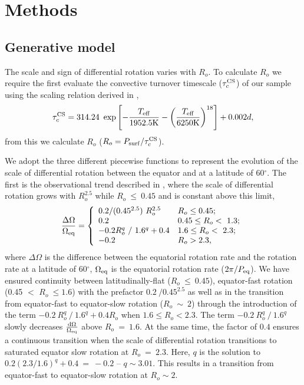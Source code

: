 \section{Methods}
\label{sec:methods}

\subsection{Generative model}

The scale and sign of differential rotation varies with $R_o$.
To calculate $R_o$ we require the first evaluate the convective turnover timescale ($\tau_c^{\rm{CS}}$) of our sample using the scaling relation derived in \citet{cranmer_testing_2011},
\begin{equation}
	\tau_c^{\rm{CS}} = 314.24 \ \exp\left[ -\frac{T_{\rm{eff}}}{1952.5\rm{K}} - \left( \frac{T_{\rm{eff}}}{6250 \rm{K}}\right)^{18}\right] + 0.002 d,
\end{equation}
from this we calculate $R_o$ ($R_o = P_{\rm{surf}}/\tau_c^{\rm{CS}}$).

We adopt the three different piecewise functions to represent the evolution of the scale of differential rotation between the equator and at a latitude of 60$^{\circ}$.
The first is the observational trend described in \citet{saar_starspots_2011}, where the scale of differential rotation grows with $R_o^{2.5}$ while $R_o \ \leq \ 0.45$ and is constant above this limit,
\begin{equation}
\label{eq:rot_saar}
{\centering
\frac{\Delta\Omega}{\Omega_{\rm{eq}}} = \left\{
\begin{array}{ll}
 0.2/(0.45^{2.5}) \ R_o^{2.5}& R_o\leq 0.45; \\
 0.2 & 0.45 \leq R_o < \ 1.3;\\
 -0.2 R_o^q \ / \ 1.6^q + 0.4 & 1.6 \leq R_o < \ 2.3;\\
 -0.2 & R_o > 2.3,
\end{array} 
\right.}
\end{equation}
where $\Delta \Omega$ is the difference between the equatorial rotation rate and the rotation rate at a latitude of 60$^{\circ}$, $\Omega_{\rm{eq}}$ is the equatorial rotation rate ($2\pi/P_{\rm{eq}}$).
We have ensured continuity between latitudinally-flat ($R_o \ \leq \ 0.45$), equator-fast rotation (0.45 $<$ $R_o \ \leq 1.6$) with the prefactor $0.2 \ / 0.45^{2.5}$ as well as in the transition from equator-fast to equator-slow rotation ($R_o \ \sim \ 2$) through the introduction of the term $-0.2 \ R_o^q \ / \ 1.6^q + 0.4 R_o$ when $1.6 \leq R_o < 2.3$.
The term $-0.2 \ R_o^q \ / \ 1.6^q$ slowly decreases $\frac{\rm{d}\Omega}{\Omega_{\rm{eq}}}$ above $R_o \ = \ 1.6$. At the same time, the factor of $0.4$ ensures a continuous transition when the scale of differential rotation transitions to saturated equator slow rotation at $R_o \ = \ 2.3$.
Here, $q$ is the solution to $0.2 \left(2.3/1.6\right)^q + 0.4 \ = \ -0.2 $ -- $q \sim 3.01$.
This results in a transition from equator-fast to equator-slow rotation at $R_o \sim 2$.

